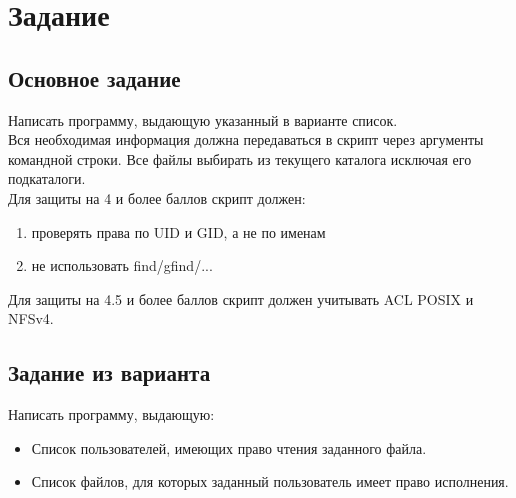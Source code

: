 \section{Задание}
\subsection{Основное задание}
Написать программу, выдающую указанный в варианте список.\\

Вся необходимая информация должна передаваться в скрипт через аргументы командной строки. Все файлы выбирать из текущего каталога исключая его подкаталоги.\\

Для защиты на 4 и более баллов скрипт должен: 
\begin{enumerate}
	\item проверять права по UID и GID, а не по именам
	\item не использовать find/gfind/...
\end{enumerate} 

Для защиты на 4.5 и более баллов скрипт должен учитывать ACL POSIX и NFSv4.\\

\subsection{Задание из варианта}
Написать программу, выдающую:
\begin{itemize}
    \item Список пользователей, имеющих право чтения заданного файла.
    \item Список файлов, для которых заданный пользователь имеет право исполнения.
\end{itemize}
